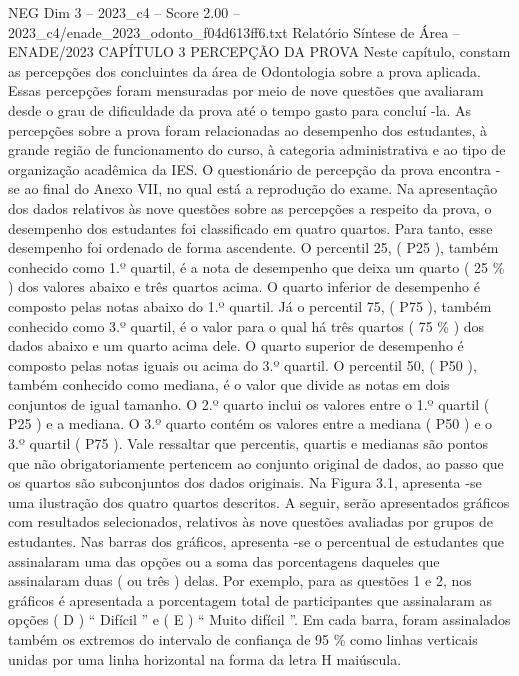 \begin{textsample}{NEG Dim 3 – 2023\_c4 – Score 2.00 – 2023\_c4/enade\_2023\_odonto\_f04d613ff6.txt}  \label{ex:f3_neg_207}
Relatório Síntese de Área – ENADE/2023 CAPÍTULO 3 PERCEPÇÃO DA PROVA Neste capítulo, constam as percepções dos concluintes da área de Odontologia sobre a prova aplicada.
Essas percepções foram mensuradas por meio de nove questões que avaliaram desde o grau de dificuldade da prova até o tempo gasto para concluí -la.
As percepções sobre a prova foram relacionadas ao desempenho dos estudantes, à grande região de funcionamento do curso, à categoria administrativa e ao tipo de organização acadêmica da IES.
O questionário de percepção da prova encontra -se ao final do Anexo VII, no qual está a reprodução do exame.
Na apresentação dos dados relativos às nove questões sobre as percepções a respeito da prova, o desempenho dos estudantes foi classificado em quatro quartos.
Para tanto, esse desempenho foi ordenado de forma ascendente.
O percentil 25, ( P25 ), também conhecido como 1.º quartil, é a nota de desempenho que deixa um quarto ( 25 \% ) dos valores abaixo e três quartos acima.
O quarto inferior de desempenho é composto pelas notas abaixo do 1.º quartil.
Já o percentil 75, ( P75 ), também conhecido como 3.º quartil, é o valor para o qual há três quartos ( 75 \% ) dos dados abaixo e um quarto acima dele.
O quarto superior de desempenho é composto pelas notas iguais ou acima do 3.º quartil.
O percentil 50, ( P50 ), também conhecido como mediana, é o valor que divide as notas em dois conjuntos de igual tamanho.
O 2.º quarto inclui os valores entre o 1.º quartil ( P25 ) e a mediana.
O 3.º quarto contém os valores entre a mediana ( P50 ) e o 3.º quartil ( P75 ).
Vale ressaltar que percentis, quartis e medianas são pontos que não obrigatoriamente pertencem ao conjunto original de dados, ao passo que os quartos são subconjuntos dos dados originais.
Na Figura 3.1, apresenta -se uma ilustração dos quatro quartos descritos.
A seguir, serão apresentados gráficos com resultados selecionados, relativos às nove questões avaliadas por grupos de estudantes.
Nas barras dos gráficos, apresenta -se o percentual de estudantes que assinalaram uma das opções ou a soma das porcentagens daqueles que assinalaram duas ( ou três ) delas.
Por exemplo, para as questões 1 e 2, nos gráficos é apresentada a porcentagem total de participantes que assinalaram as opções ( D ) “ Difícil ” e ( E ) “ Muito difícil ”.
Em cada barra, foram assinalados também os extremos do intervalo de confiança de 95 \% como linhas verticais unidas por uma linha horizontal na forma da letra H maiúscula.

\end{textsample}
